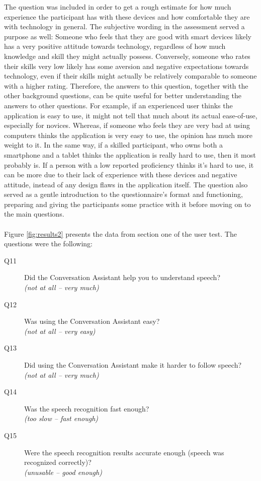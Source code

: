 \documentclass[english, 12pt, a4paper, pdftex, elec, utf8]{aaltothesis}
\begin{document}
The question was included in order to get a rough estimate for how much experience the participant has with these devices and how comfortable they are with technology in general. The subjective wording in the assessment served a purpose as well: Someone who feels that they are good with smart devices likely has a very positive attitude towards technology, regardless of how much knowledge and skill they might actually possess.  Conversely, someone who rates their skills very low likely has some aversion and negative expectations towards technology, even if their skills might actually be relatively comparable to someone with a higher rating. Therefore, the answers to this question, together with the other background questions, can be quite useful for better understanding the answers to other questions. For example, if an experienced user thinks the application is easy to use, it might not tell that much about its actual ease-of-use, especially for novices. Whereas, if someone who feels they are very bad at using computers thinks the application is very easy to use, the opinion has much more weight to it. In the same way, if a skilled participant, who owns both a smartphone and a tablet thinks the application is really hard to use, then it most probably is. If a person with a low reported proficiency thinks it's hard to use, it can be more due to their lack of experience with these devices and negative attitude, instead of any design flaws in the application itself. The question also served as a gentle introduction to the questionnaire's format and functioning, preparing and giving the participants some practice with it before moving on to the main questions. \\\\
Figure \ref{fig:results2} presents the data from section one of the user test. The questions were the following:
\begin{description}
	\item[Q11] Did the Conversation Assistant help you to understand speech? \\ \textit{(not at all -- very much)}
	\item[Q12] Was using the Conversation Assistant easy? \\ \textit{(not at all -- very easy)}
	\item[Q13] Did using the Conversation Assistant make it harder to follow speech? \\ \textit{(not at all -- very much)}
	\item[Q14] Was the speech recognition fast enough? \\ \textit{(too slow -- fast enough)}
	\item[Q15] Were the speech recognition results accurate enough (speech was recognized correctly)? \\ \textit{(unusable -- good enough)}
\end{description}
\end{document}
